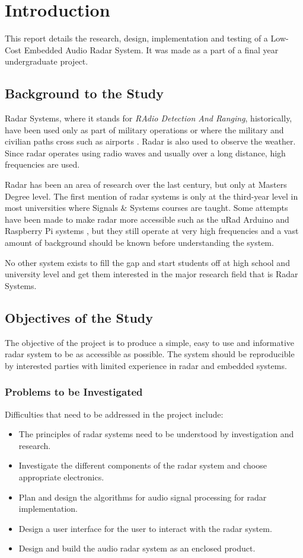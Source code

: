 \chapter{Introduction}\label{chap:Introduction}
This report details the research, design, implementation and testing of a Low-Cost Embedded Audio Radar System. It was made as a part of a final year undergraduate project.

\section{Background to the Study}
Radar Systems, where it stands for \textit{RAdio Detection And Ranging}, historically, have been used only as part of military operations or where the military and civilian paths cross such as airports \cite{watson_radar_2009}. Radar is also used to observe the weather.  Since radar operates using radio waves and usually over a long distance, high frequencies are used. 

Radar has been an area of research over the last century, but only at Masters Degree level. The first mention of radar systems is only at the third-year level in most universities where Signals \& Systems courses are taught. Some attempts have been made to make radar more accessible such as the uRad Arduino and Raspberry Pi systems \cite{noauthor_urad_2018}, but they still operate at very high frequencies and a vast amount of background should be known before understanding the system.

No other system exists to fill the gap and start students off at high school and university level and get them interested in the major research field that is Radar Systems.

\section{Objectives of the Study}
The objective of the project is to produce a simple, easy to use and informative radar system to be as accessible as possible. The system should be reproducible by interested parties with limited experience in radar and embedded systems.
\subsection{Problems to be Investigated}
Difficulties that need to be addressed in the project include:
\begin{itemize}
\item The principles of radar systems need to be understood by investigation and research.
\item Investigate the different components of the radar system and choose appropriate electronics.
\item Plan and design the algorithms for audio signal processing for radar implementation.
\item Design a user interface for the user to interact with the radar system.
\item Design and build the audio radar system as an enclosed product.
\end{itemize}

